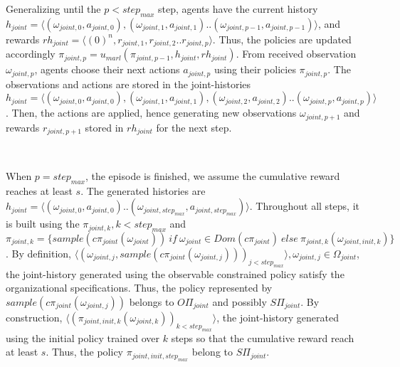 \begin{proofoutline}

    Generalizing until the $p < step_{max}$ step, agents have the current history $h_{joint} = \langle (\omega_{joint,0}, a_{joint,0}), (\omega_{joint,1}, a_{joint,1})..(\omega_{joint,p-1}, a_{joint,p-1}) \rangle$, and rewards $rh_{joint} = \langle (0)^n, r_{joint,1}, r_{joint,2}..r_{joint,p} \rangle$. Thus, the policies are updated accordingly $\pi_{joint,p} = u_{marl}(\pi_{joint,p-1},h_{joint},rh_{joint})$. From received observation $\omega_{joint,p}$, agents choose their next actions $a_{joint,p}$ using their policies $\pi_{joint,p}$. The observations and actions are stored in the joint-histories $h_{joint} \allowbreak = \allowbreak \langle \allowbreak (\omega_{joint,0},a_{joint,0}), \allowbreak (\omega_{joint,1},a_{joint,1}), (\omega_{joint,2},a_{joint,2})..(\omega_{joint,p},a_{joint,p}) \rangle$. Then, the actions are applied, hence generating new observations $\omega_{joint,p+1}$ and rewards $r_{joint,p+1}$ stored in $rh_{joint}$ for the next step.

    \

    When $p = step_{max}$, the episode is finished, we assume the cumulative reward reaches at least $s$. The generated histories are $h_{joint} = \langle (\omega_{joint,0},a_{joint,0}) .. \allowbreak (\omega_{joint,step_{max}},a_{joint,step_{max}}) \rangle$. Throughout all steps, it is built using the $\pi_{joint,k}, \allowbreak k < step_{max}$ and $\pi_{joint,k} \allowbreak = \allowbreak \{sample(c\pi_{joint}(\omega_{joint})) \allowbreak \ \allowbreak if \allowbreak \ \allowbreak \omega_{joint} \in Dom(c\pi_{joint}) \allowbreak \ \allowbreak else \allowbreak \ \allowbreak \pi_{joint,k}(\omega_{joint,init,k})\}$.
    By definition, $\langle (\omega_{joint,j}, \allowbreak sample(c\pi_{joint}(\omega_{joint,j})))_{j < step_{max}} \rangle, \allowbreak \omega_{joint,j} \allowbreak \in \Omega_{joint}$, the joint-history generated using the observable constrained policy satisfy the organizational specifications. Thus, the policy represented by $sample(c\pi_{joint}(\omega_{joint,j}))$ belongs to $O\Pi_{joint}$ and possibly $S\Pi_{joint}$.
    By construction, $\langle (\pi_{joint,init,k}(\omega_{joint,k}))_{k < step_{max}} \rangle$, the joint-history generated using the initial policy trained over $k$ steps so that the cumulative reward reach at least $s$. Thus, the policy $\pi_{joint,init,step_{max}}$ belong to $S\Pi_{joint}$.


\end{proofoutline}
